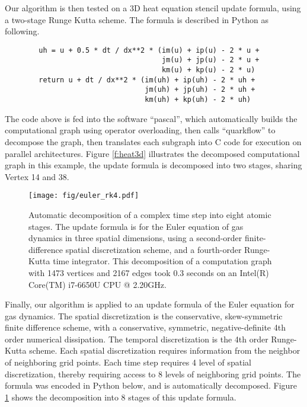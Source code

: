 \documentclass[review]{siamart0216}
\begin{document}
Our algorithm is then tested on a 3D heat equation stencil update formula,
using a two-stage Runge Kutta scheme.  The formula is described in Python
as following.
\begin{lstlisting}
        uh = u + 0.5 * dt / dx**2 * (im(u) + ip(u) - 2 * u +
                                     jm(u) + jp(u) - 2 * u +
                                     km(u) + kp(u) - 2 * u)
        return u + dt / dx**2 * (im(uh) + ip(uh) - 2 * uh +
                                 jm(uh) + jp(uh) - 2 * uh +
                                 km(uh) + kp(uh) - 2 * uh)
\end{lstlisting}
The code above is fed into the software ``pascal''\footnotemark[1],
which automatically builds the computational graph using operator overloading,
then calls ``quarkflow'' to decompose the graph, then translates each
subgraph into C code for execution on parallel architectures.  Figure
\ref{f:heat3d} illustrates the decomposed computational graph in this
example, the update formula is decomposed into two stages, sharing Vertex
14 and 38.

\begin{figure}[htb!] \centering
    \texttt{[image: fig/euler\_rk4.pdf]}
    \caption{Automatic decomposition of a complex time step into eight atomic
    stages.  The update formula is for the Euler equation of
    gas dynamics in three spatial dimensions, using a second-order
    finite-difference spatial discretization scheme, and a fourth-order
    Runge-Kutta time integrator.  This decomposition of a computation graph
    with 1473 vertices and 2167 edges took 0.3 seconds on
    an Intel(R) Core(TM) i7-6650U CPU @ 2.20GHz.}
    \label{f:euler3d}
\end{figure}

Finally, our algorithm is applied to an update formula of the Euler equation
for gas dynamics.  The spatial discretization is the conservative,
skew-symmetric finite difference scheme, with a conservative, symmetric,
negative-definite 4th order numerical dissipation. The temporal discretization
is the 4th order Runge-Kutta scheme.  Each spatial discretization requires
information from the neighbor of neighboring grid points.  Each time step
requires 4 level of spatial discretization, thereby requiring access to 8
levels of neighboring grid points.  The formula was encoded in Python below,
and is automatically decomposed.  Figure \ref{f:euler3d} shows the
decomposition into 8 stages of this update formula.
\end{document}
